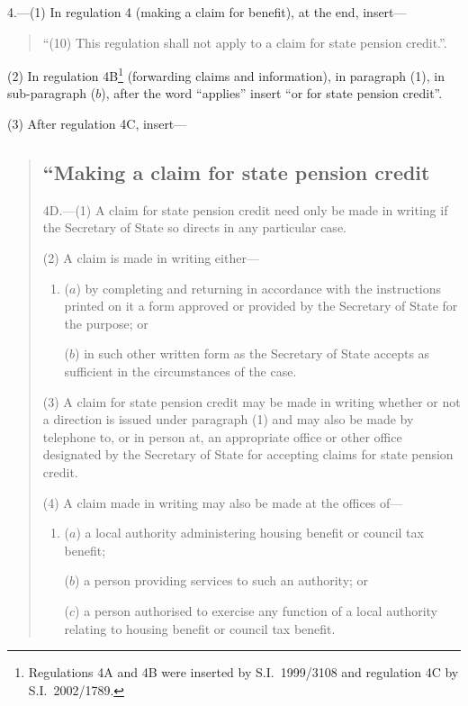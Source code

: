 \documentclass[12pt,a4paper]{article}
\begin{document}
4.---(1)  In regulation 4 (making a claim for benefit), at the end, insert—
\begin{quotation}
“(10) This regulation shall not apply to a claim for state pension credit.”.
\end{quotation}

(2) In regulation 4B\footnote{Regulations 4A and 4B were inserted by S.I.\ 1999/3108 and regulation 4C by S.I.\ 2002/1789.} (forwarding claims and information), in paragraph (1), in sub-paragraph ($b$), after the word “applies” insert “or for state pension credit”.

(3) After regulation 4C, insert—
\begin{quotation}
\subsection*{“Making a claim for state pension credit}

4D.---(1)  A claim for state pension credit need only be made in writing if the Secretary of State so directs in any particular case.

(2) A claim is made in writing either—
\begin{enumerate}\item[]
($a$) by completing and returning in accordance with the instructions printed on it a form approved or provided by the Secretary of State for the purpose; or

($b$) in such other written form as the Secretary of State accepts as sufficient in the circumstances of the case.
\end{enumerate}

(3) A claim for state pension credit may be made in writing whether or not a direction is issued under paragraph (1) and may also be made by telephone to, or in person at, an appropriate office or other office designated by the Secretary of State for accepting claims for state pension credit.

(4) A claim made in writing may also be made at the offices of—
\begin{enumerate}\item[]
($a$) a local authority administering housing benefit or council tax benefit;

($b$) a person providing services to such an authority; or

($c$) a person authorised to exercise any function of a local authority relating to housing benefit or council tax benefit.
\end{enumerate}


\end{quotation}
\end{document}
